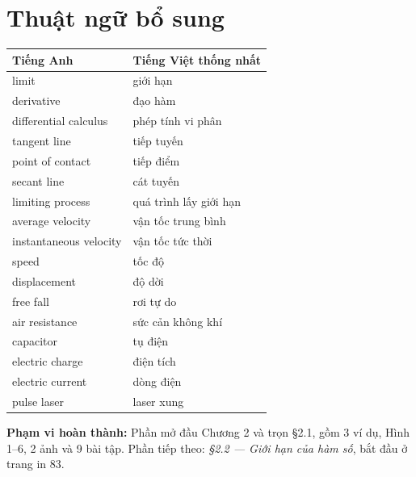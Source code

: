 \documentclass[12pt,a4paper]{article}
\begin{document}
\section*{Thuật ngữ bổ sung}
\begin{center}\begin{tabular}{ll}\toprule Tiếng Anh&Tiếng Việt thống nhất\\\midrule
limit&giới hạn\\
derivative&đạo hàm\\
differential calculus&phép tính vi phân\\
tangent line&tiếp tuyến\\
point of contact&tiếp điểm\\
secant line&cát tuyến\\
limiting process&quá trình lấy giới hạn\\
average velocity&vận tốc trung bình\\
instantaneous velocity&vận tốc tức thời\\
speed&tốc độ\\
displacement&độ dời\\
free fall&rơi tự do\\
air resistance&sức cản không khí\\
capacitor&tụ điện\\
electric charge&điện tích\\
electric current&dòng điện\\
pulse laser&laser xung\\
\bottomrule\end{tabular}\end{center}
\noindent\textbf{Phạm vi hoàn thành:} Phần mở đầu Chương 2 và trọn §2.1, gồm 3 ví dụ, Hình 1–6, 2 ảnh và 9 bài tập. Phần tiếp theo: \textit{§2.2 — Giới hạn của hàm số}, bắt đầu ở trang in 83.
\end{document}
